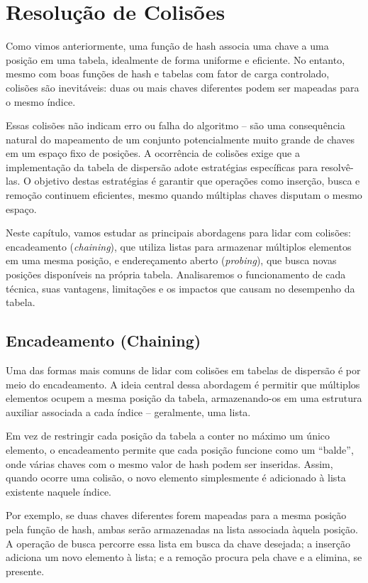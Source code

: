 \chapter{Resolução de Colisões}

Como vimos anteriormente, uma função de hash associa uma chave a uma posição em uma tabela, idealmente de forma uniforme e eficiente. 
No entanto, mesmo com boas funções de hash e tabelas com fator de carga controlado, colisões são inevitáveis: duas ou mais chaves diferentes podem ser mapeadas para o mesmo índice.

Essas colisões não indicam erro ou falha do algoritmo -- são uma consequência natural do mapeamento de um conjunto potencialmente muito grande de chaves em um espaço fixo de posições. 
A ocorrência de colisões exige que a implementação da tabela de dispersão adote estratégias específicas para resolvê-las. 
O objetivo destas estratégias é garantir que operações como inserção, busca e remoção continuem eficientes, mesmo quando múltiplas chaves disputam o mesmo espaço.

Neste capítulo, vamos estudar as principais abordagens para lidar com colisões: encadeamento ({\em chaining}), que utiliza listas para armazenar múltiplos elementos em uma mesma posição, e endereçamento aberto ({\em probing}), que busca novas posições disponíveis na própria tabela. 
Analisaremos o funcionamento de cada técnica, suas vantagens, limitações e os impactos que causam no desempenho da tabela.

\section{Encadeamento (Chaining)}

Uma das formas mais comuns de lidar com colisões em tabelas de dispersão é por meio do encadeamento. 
A ideia central dessa abordagem é permitir que múltiplos elementos ocupem a mesma posição da tabela, armazenando-os em uma estrutura auxiliar associada a cada índice -- geralmente, uma lista.

Em vez de restringir cada posição da tabela a conter no máximo um único elemento, o encadeamento permite que cada posição funcione como um ``balde'', onde várias chaves com o mesmo valor de hash podem ser inseridas. 
Assim, quando ocorre uma colisão, o novo elemento simplesmente é adicionado à lista existente naquele índice.

Por exemplo, se duas chaves diferentes forem mapeadas para a mesma posição pela função de hash, ambas serão armazenadas na lista associada àquela posição. 
A operação de busca percorre essa lista em busca da chave desejada; a inserção adiciona um novo elemento à lista; e a remoção procura pela chave e a elimina, se presente.

